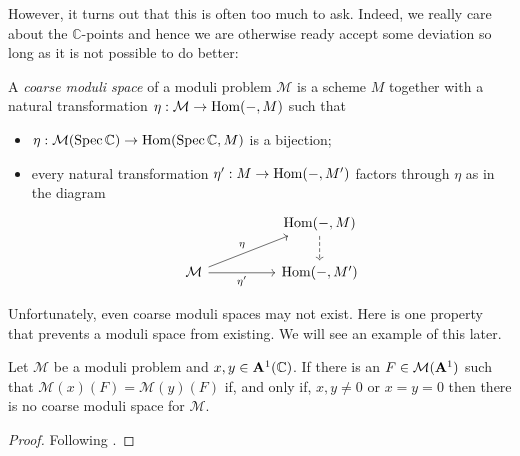 \documentclass[12pt]{ociamthesis}  %
\begin{document}
\begin{example}
  \missingexample
\end{example}

However, it turns out that this is often too much to ask. Indeed,
we really care about the $\mathbb{C}$-points and hence
we are otherwise ready accept some deviation so long as it is not
possible to do better:

\begin{definition}\missingcitation
  A \emph{coarse moduli space} of a moduli problem $\mathcal M$
  is a scheme $M$ together with a natural transformation
  $\eta : \mathcal M \to \operatorname{Hom}(-,M)$ such that
  \begin{itemize}
    \item $\eta : \mathcal M(\operatorname{Spec}\mathbb{C})\to \operatorname{Hom}(\operatorname{Spec}\mathbb{C},M)$ is a bijection;
    \item every natural transformation $\eta' : M \to \operatorname{Hom}(-,M')$ factors through
          $\eta$ as in the diagram
          \begin{equation*}
            \begin{tikzcd}
              && {\text{Hom}(-,M)} \\
              {\mathcal M} && {\text{Hom}(-,M')}
              \arrow[dashed, from=1-3, to=2-3]
              \arrow["\eta", from=2-1, to=1-3]
              \arrow["{\eta'}"', from=2-1, to=2-3]
            \end{tikzcd}
          \end{equation*}
  \end{itemize}
\end{definition}

\begin{example}
  \missingexample
\end{example}

Unfortunately, even coarse moduli spaces may not exist. Here is
one property that prevents a moduli space from existing. We will
see an example of this later. 

\begin{lemma}\label{lem:no_coarse_condition}
  Let $\mathcal M$ be a moduli problem and
  $x,y\in \mathbf{A}^{1}_{}(\mathbb{C})$. If there is an
  $F\in\mathcal M(\mathbf{A}^{1}_{})$ such that
  $\mathcal M(x)(F) = \mathcal M(y)(F)$ if, and only if,
  $x,y\neq 0$ or $x=y=0$ then there is no coarse moduli space
  for $\mathcal M$.
  \begin{proof}
    Following \cite[Lemma 2.27]{hoskins2016}.
    \missingproof
  \end{proof}
\end{lemma}
\end{document}
